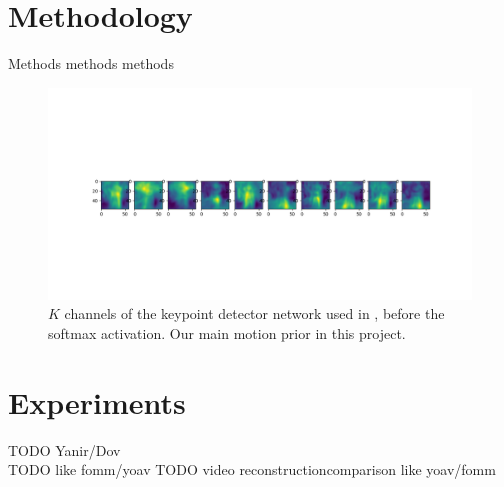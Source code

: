 \documentclass{article}
\begin{document}
\section{Methodology}
Methods
methods
methods
\label{method}
\begin{figure}[ht]
\vskip 0.2in
\begin{center}
\centerline{\includegraphics[width=\columnwidth]{mask_10kp}}
\caption{
$K$ channels of the keypoint detector network used in
\cite{siarohin2020order}, before the softmax activation. Our main motion
prior in this project.
}
\label{mask-10kp}
\end{center}
\vskip -0.2in
\end{figure}
\section{Experiments}


TODO Yanir/Dov
\\
TODO like fomm/yoav
TODO video reconstructioncomparison like yoav/fomm
\end{document}
